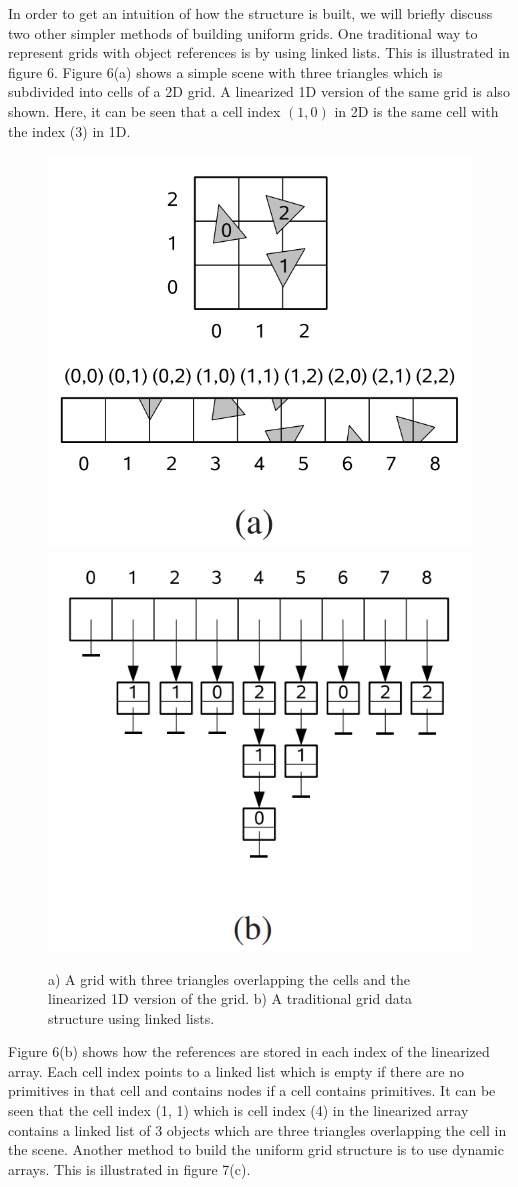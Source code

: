 \documentclass[11pt,a4paper]{article}
\begin{document}
In order to get an intuition of how the structure is built, we will briefly discuss two other simpler methods of building uniform grids. One traditional way to represent grids with object references is by using linked lists. This is illustrated in figure 6. Figure 6(a) shows a simple scene with three triangles which is subdivided into cells of a 2D grid. A linearized 1D version of the same grid is also shown. Here, it can be seen that a cell index $(1, 0)$ in 2D is the same cell with the index (3) in 1D.
\begin{figure}[H]
	\centering
	\captionsetup{justification=centering}
	\includegraphics[width=.28\textwidth]{uniformgrids1}\quad
	\includegraphics[width=.28\textwidth]{uniformgrids2}\quad
	\caption{a) A grid with three triangles overlapping the cells and the linearized 1D version of the grid. b) A traditional grid data structure using linked lists. \protect\cite{lagae2008compact}}
\end{figure}
Figure 6(b) shows how the references are stored in each index of the linearized array. Each cell index points to a linked list which is empty if there are no primitives in that cell and contains nodes if a cell contains primitives. It can be seen that the cell index (1, 1) which is cell index (4) in the linearized array contains a linked list of 3 objects which are three triangles overlapping the cell in the scene. Another method to build the uniform grid structure is to use dynamic arrays. This is illustrated in figure 7(c).
\end{document}
